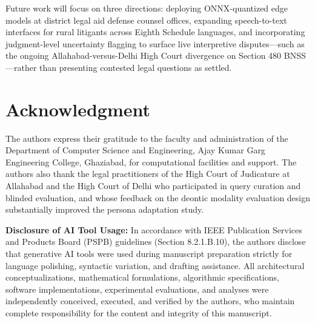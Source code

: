 \documentclass[conference]{IEEEtran}
\begin{document}
Future work will focus on three directions: deploying ONNX-quantized edge models at district legal aid defense counsel offices, expanding speech-to-text interfaces for rural litigants across Eighth Schedule languages, and incorporating judgment-level uncertainty flagging to surface live interpretive disputes---such as the ongoing Allahabad-versus-Delhi High Court divergence on Section 480 BNSS---rather than presenting contested legal questions as settled.

\section*{Acknowledgment}
The authors express their gratitude to the faculty and administration of the Department of Computer Science and Engineering, Ajay Kumar Garg Engineering College, Ghaziabad, for computational facilities and support. The authors also thank the legal practitioners of the High Court of Judicature at Allahabad and the High Court of Delhi who participated in query curation and blinded evaluation, and whose feedback on the deontic modality evaluation design substantially improved the persona adaptation study.

\noindent\textbf{Disclosure of AI Tool Usage:} In accordance with IEEE Publication Services and Products Board (PSPB) guidelines (Section 8.2.1.B.10), the authors disclose that generative AI tools were used during manuscript preparation strictly for language polishing, syntactic variation, and drafting assistance. All architectural conceptualizations, mathematical formulations, algorithmic specifications, software implementations, experimental evaluations, and analyses were independently conceived, executed, and verified by the authors, who maintain complete responsibility for the content and integrity of this manuscript.
\end{document}
